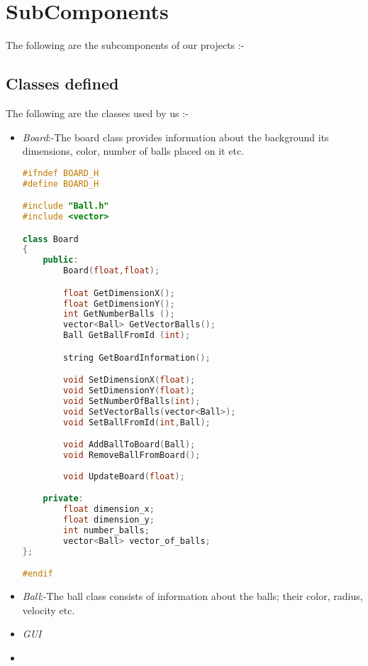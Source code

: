 \section{SubComponents}
The following are the subcomponents of our projects :-
\subsection{Classes defined}
The following are the classes used by us :-
\begin{itemize}
\item \textit{Board}:-The board class provides information about the background its dimensions, color, number of balls placed on it etc.

%

\begin{lstlisting}[language=C++, caption={C++ code using listings}]
#ifndef BOARD_H
#define BOARD_H

#include "Ball.h"
#include <vector>

class Board
{
	public:
		Board(float,float);

		float GetDimensionX();
		float GetDimensionY();
		int GetNumberBalls ();
		vector<Ball> GetVectorBalls();
		Ball GetBallFromId (int);

		string GetBoardInformation();

		void SetDimensionX(float);
		void SetDimensionY(float);
		void SetNumberOfBalls(int);
		void SetVectorBalls(vector<Ball>);
		void SetBallFromId(int,Ball);

		void AddBallToBoard(Ball);
		void RemoveBallFromBoard();
		
		void UpdateBoard(float);

	private:
		float dimension_x;
		float dimension_y;
		int number_balls;
		vector<Ball> vector_of_balls;
};

#endif
\end{lstlisting}
%
\item \textit{Ball}:-The ball class consists of information about the balls; their color, radius, velocity etc.
\item\textit{GUI}
\item\textit{}
\end{itemize}
